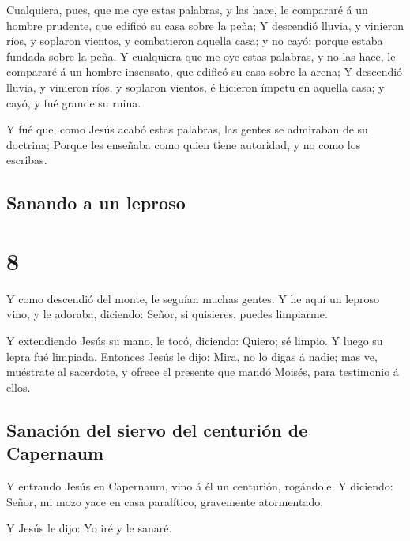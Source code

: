  Cualquiera, pues, que me oye estas palabras, y las hace,
le compararé á un hombre prudente, que edificó su casa sobre la peña;
 Y descendió lluvia, y vinieron ríos, y soplaron vientos,
y combatieron aquella casa; y no cayó: porque estaba fundada sobre la
peña.  Y cualquiera que me oye estas palabras, y no las
hace, le compararé á un hombre insensato, que edificó su casa sobre la
arena;  Y descendió lluvia, y vinieron ríos, y soplaron
vientos, é hicieron ímpetu en aquella casa; y cayó, y fué grande su
ruina.

 Y fué que, como Jesús acabó estas palabras, las gentes
se admiraban de su doctrina;  Porque les enseñaba como
quien tiene autoridad, y no como los escribas.

\hypertarget{sanando-a-un-leproso}{%
\subsection{Sanando a un leproso}\label{sanando-a-un-leproso}}

\hypertarget{section-7}{%
\section{8}\label{section-7}}

 Y como descendió del monte, le seguían muchas gentes.
 Y he aquí un leproso vino, y le adoraba, diciendo: Señor,
si quisieres, puedes limpiarme.

 Y extendiendo Jesús su mano, le tocó, diciendo: Quiero;
sé limpio. Y luego su lepra fué limpiada.  Entonces Jesús
le dijo: Mira, no lo digas á nadie; mas ve, muéstrate al sacerdote, y
ofrece el presente que mandó Moisés, para testimonio á ellos.

\hypertarget{sanaciuxf3n-del-siervo-del-centuriuxf3n-de-capernaum}{%
\subsection{Sanación del siervo del centurión de
Capernaum}\label{sanaciuxf3n-del-siervo-del-centuriuxf3n-de-capernaum}}

 Y entrando Jesús en Capernaum, vino á él un centurión,
rogándole,  Y diciendo: Señor, mi mozo yace en casa
paralítico, gravemente atormentado.

 Y Jesús le dijo: Yo iré y le sanaré.

